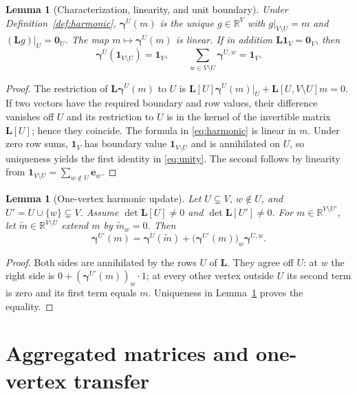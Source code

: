\documentclass[11pt]{article}
\newtheorem{lemma}[definition]{Lemma}
\newcommand{\R}{\mathbb R}
\newcommand{\one}{\mathbf 1}
\newcommand{\zero}{\mathbf 0}
\newcommand{\Lmat}{\mathbf L}
\newcommand{\gam}{\boldsymbol\gamma}
\begin{document}
\begin{lemma}[Characterization, linearity, and unit boundary]\label{lem:harmonic}
Under Definition~\ref{def:harmonic}, $\gam^U(m)$ is the unique
$g\in\R^V$ with $g|_{V\setminus U}=m$ and
$(\Lmat g)|_U=\zero_U$. The map $m\mapsto\gam^U(m)$ is linear.
If in addition $\Lmat\one_V=\zero_V$, then
\begin{equation}\label{eq:unity}
\gam^U(\one_{V\setminus U})=\one_V,
\qquad
\sum_{w\in V\setminus U}\gam^{U,w}=\one_V.
\end{equation}
\end{lemma}
\begin{proof}
The restriction of $\Lmat\gam^U(m)$ to $U$ is
$\Lmat[U]\gam^U(m)|_U+\Lmat[U,V\setminus U]m=0$.
If two vectors have the required boundary and row values, their
difference vanishes off $U$ and its restriction to $U$ is in the
kernel of the invertible matrix $\Lmat[U]$; hence they coincide.
The formula in \eqref{eq:harmonic} is linear in $m$. Under zero row
sums, $\one_V$ has boundary value $\one_{V\setminus U}$ and is
annihilated on $U$, so uniqueness yields the first identity in
\eqref{eq:unity}. The second follows by linearity from
$\one_{V\setminus U}=\sum_{w\notin U}\mathbf e_w$.
\end{proof}

\begin{lemma}[One-vertex harmonic update]\label{lem:one-step}
Let $U\subsetneq V$, $w\notin U$, and $U'=U\cup\{w\}\subsetneq V$.
Assume $\det\Lmat[U]\neq0$ and $\det\Lmat[U']\neq0$.
For $m\in\R^{V\setminus U'}$, let $\widetilde m\in\R^{V\setminus U}$
extend $m$ by $\widetilde m_w=0$. Then
\begin{equation}\label{eq:one-step}
\gam^{U'}(m)
=\gam^U(\widetilde m)
 +\bigl(\gam^{U'}(m)\bigr)_w\gam^{U,w}.
\end{equation}
\end{lemma}
\begin{proof}
Both sides are annihilated by the rows $U$ of $\Lmat$. They agree
off $U$: at $w$ the right side is
$0+(\gam^{U'}(m))_w\cdot1$; at every other vertex outside $U$ its
second term is zero and its first term equals $m$. Uniqueness in
Lemma~\ref{lem:harmonic} proves the equality.
\end{proof}

\section{Aggregated matrices and one-vertex transfer}
\end{document}
